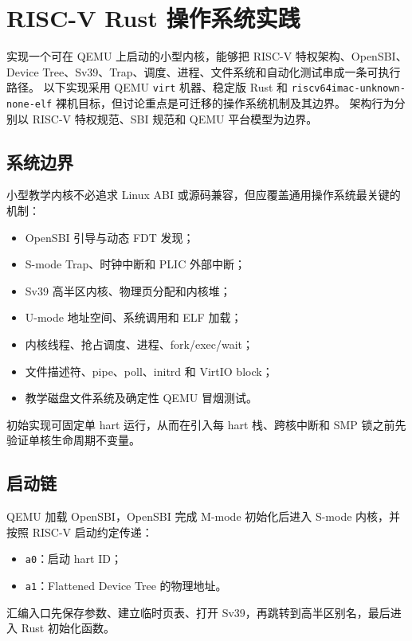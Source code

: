 \chapter{RISC-V Rust 操作系统实践}
\label{chap:case-rustos}

实现一个可在 QEMU 上启动的小型内核，能够把 RISC-V 特权架构、OpenSBI、Device Tree、Sv39、Trap、调度、进程、文件系统和自动化测试串成一条可执行路径。
以下实现采用 QEMU \texttt{virt} 机器、稳定版 Rust 和 \texttt{riscv64imac-unknown-none-elf} 裸机目标，但讨论重点是可迁移的操作系统机制及其边界。
架构行为分别以 RISC-V 特权规范、SBI 规范和 QEMU 平台模型为边界\cite{riscvpri,riscv-sbi,qemu-riscv}。

\section{系统边界}

小型教学内核不必追求 Linux ABI 或源码兼容，但应覆盖通用操作系统最关键的机制：
\begin{itemize}
  \item OpenSBI 引导与动态 FDT 发现；
  \item S-mode Trap、时钟中断和 PLIC 外部中断；
  \item Sv39 高半区内核、物理页分配和内核堆；
  \item U-mode 地址空间、系统调用和 ELF 加载；
  \item 内核线程、抢占调度、进程、fork/exec/wait；
  \item 文件描述符、pipe、poll、initrd 和 VirtIO block；
  \item 教学磁盘文件系统及确定性 QEMU 冒烟测试。
\end{itemize}

初始实现可固定单 hart 运行，从而在引入每 hart 栈、跨核中断和 SMP 锁之前先验证单核生命周期不变量。

\section{启动链}

QEMU 加载 OpenSBI，OpenSBI 完成 M-mode 初始化后进入 S-mode 内核，并按照 RISC-V 启动约定传递：
\begin{itemize}
  \item \texttt{a0}：启动 hart ID；
  \item \texttt{a1}：Flattened Device Tree 的物理地址。
\end{itemize}

汇编入口先保存参数、建立临时页表、打开 Sv39，再跳转到高半区别名，最后进入 Rust 初始化函数。


